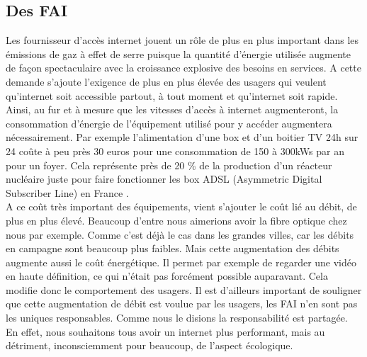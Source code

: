 \documentclass[a4paper,twocolumn,12pt]{article}
\begin{document}
\subsection{Des FAI}

	Les fournisseur d’accès internet jouent un rôle de plus en plus important dans les émissions de gaz à effet de serre puisque la quantité d'énergie utilisée augmente de façon spectaculaire avec la croissance explosive des besoins en services. A cette demande s’ajoute l’exigence de plus en plus élevée des usagers qui veulent qu’internet soit accessible partout, à tout moment et qu’internet soit rapide. Ainsi, au fur et à mesure que les vitesses d'accès à internet augmenteront, la consommation d'énergie de l'équipement utilisé pour y accéder augmentera nécessairement. Par exemple l’alimentation d’une box et d’un boitier TV 24h sur 24 coûte à peu près 30 euros pour une consommation de 150 à 300kWs par an pour un foyer. Cela représente près de 20 \% de la production d’un réacteur nucléaire juste pour faire fonctionner les box ADSL (Asymmetric Digital Subscriber Line) en France \cite{10}. \\

	A ce coût très important des équipements, vient s’ajouter le coût lié au débit, de plus en plus élevé. Beaucoup d’entre nous aimerions avoir la fibre optique chez nous par exemple. Comme c’est déjà le cas dans les grandes villes, car les débits en campagne sont beaucoup plus faibles. Mais cette augmentation des débits augmente aussi le coût énergétique. Il permet par exemple de regarder une vidéo en haute définition, ce qui n’était pas forcément possible auparavant. Cela modifie donc le comportement des usagers. Il est d’ailleurs important de souligner que cette augmentation de débit est voulue par les usagers, les FAI n’en sont pas les uniques responsables. Comme nous le disions la responsabilité est partagée. En effet, nous souhaitons tous avoir un internet plus performant, mais au détriment, inconsciemment pour beaucoup, de l’aspect écologique.

	\newpage
\end{document}
